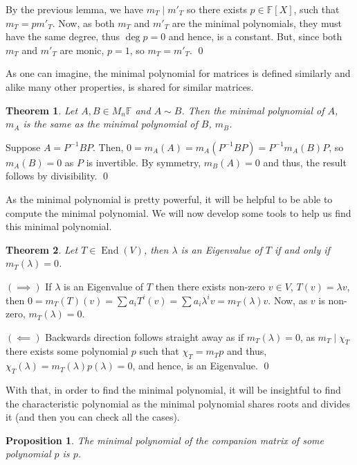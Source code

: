 \documentclass[
]{article}
\newtheorem{theorem}{Theorem}
\newtheorem{prop}{Proposition}[section]
\theoremstyle{definition}
\begin{document}
By the previous lemma, we have \(m_T \mid m'_T\) so there exists
\(p \in \mathbb{F}[X]\), such that \(m_T = p m'_T\). Now, as both
\(m_T\) and \(m'_T\) are the minimal polynomials, they must have the
same degree, thus \(\deg p = 0\) and hence, is a constant. But, since
both \(m_T\) and \(m'_T\) are monic, \(p = 1\), so \(m_T = m'_T\). \qed

As one can imagine, the minimal polynomial for matrices is defined
similarly and alike many other properties, is shared for similar
matrices.

\begin{theorem}
  Let \(A, B \in M_n{\mathbb{F}}\) and \(A \sim B\). Then the minimal polynomial 
  of \(A\), \(m_A\) is the same as the minimal polynomial of \(B\), \(m_B\).
\end{theorem}
\proof

Suppose \(A = P^{-1} B P\). Then,
\(0 = m_A(A) = m_A(P^{-1}BP) = P^{-1} m_A(B) P\), so \(m_A(B) = 0\) as
\(P\) is invertible. By symmetry, \(m_B(A) = 0\) and thus, the result
follows by divisibility. \qed

As the minimal polynomial is pretty powerful, it will be helpful to be
able to compute the minimal polynomial. We will now develop some tools
to help us find this minimal polynomial.

\begin{theorem}
  Let \(T \in \mathop{\mathrm{End}}(V)\), then \(\lambda\) is an Eigenvalue of \(T\) if and only 
  if \(m_T(\lambda) = 0\).
\end{theorem}
\proof

\((\implies)\) If \(\lambda\) is an Eigenvalue of \(T\) then there
exists non-zero \(v \in V\), \(T(v) = \lambda v\), then
\(0 = m_T(T)(v) = \sum a_i T^i(v) = \sum a_i \lambda^i v = m_T(\lambda)v\).
Now, as \(v\) is non-zero, \(m_T(\lambda) = 0\).

\((\impliedby)\) Backwards direction follows straight away as if
\(m_T(\lambda) = 0\), as \(m_T \mid \chi_T\) there exists some
polynomial \(p\) such that \(\chi_T = m_T p\) and thus,
\(\chi_T(\lambda)  = m_T(\lambda)p(\lambda) = 0\), and hence, is an
Eigenvalue. \qed

With that, in order to find the minimal polynomial, it will be
insightful to find the characteristic polynomial as the minimal
polynomial shares roots and divides it (and then you can check all the
cases).

\begin{prop}\label{comp_min}
  The minimal polynomial of the companion matrix of some polynomial \(p\) is \(p\).
\end{prop}
\end{document}
